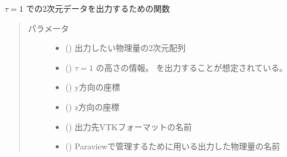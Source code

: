 \documentclass[letterpaper,10pt,dvipdfmx,report]{sphinxmanual}
\begin{document}

\begin{fulllineitems}
\label{\detokenize{paraview:R2D2.vtk.write_optical_surface}}
\(\tau=1\) での2次元データを出力するための関数
\begin{quote}\begin{description}
\item[{パラメータ}] \leavevmode\begin{itemize}
\item {} 
 () \sphinxhyphen{}\sphinxhyphen{} 出力したい物理量の2次元配列

\item {} 
 () \sphinxhyphen{}\sphinxhyphen{} \(\tau=1\) の高さの情報。 を出力することが想定されている。

\item {} 
 () \sphinxhyphen{}\sphinxhyphen{} y方向の座標

\item {} 
 () \sphinxhyphen{}\sphinxhyphen{} z方向の座標

\item {} 
 () \sphinxhyphen{}\sphinxhyphen{} 出力先VTKフォーマットの名前

\item {} 
 () \sphinxhyphen{}\sphinxhyphen{} Paraviewで管理するために用いる出力した物理量の名前

\end{itemize}

\end{description}\end{quote}

\end{fulllineitems}
\end{document}
